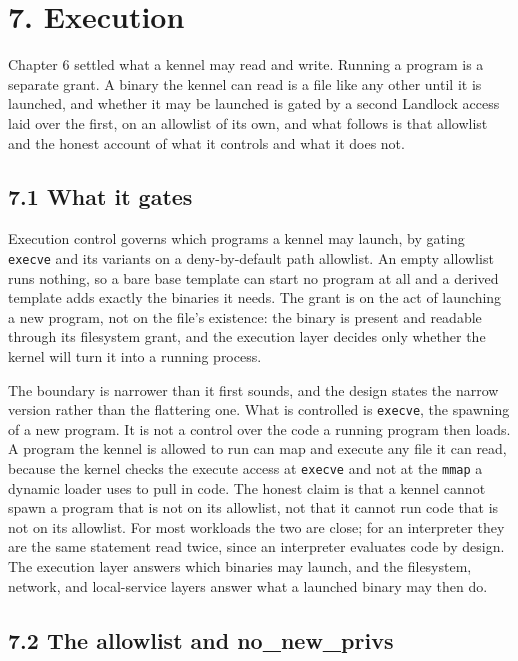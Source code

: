 \hypertarget{execution}{%
\chapter{7. Execution}\label{execution}}

Chapter 6 settled what a kennel may read and write. Running a program is
a separate grant. A binary the kennel can read is a file like any other
until it is launched, and whether it may be launched is gated by a
second Landlock access laid over the first, on an allowlist of its own,
and what follows is that allowlist and the honest account of what it
controls and what it does not.

\hypertarget{what-it-gates}{%
\section{7.1 What it gates}\label{what-it-gates}}

Execution control governs which programs a kennel may launch, by gating
\texttt{execve} and its variants on a deny-by-default path allowlist. An
empty allowlist runs nothing, so a bare base template can start no
program at all and a derived template adds exactly the binaries it
needs. The grant is on the act of launching a new program, not on the
file's existence: the binary is present and readable through its
filesystem grant, and the execution layer decides only whether the
kernel will turn it into a running process.

The boundary is narrower than it first sounds, and the design states the
narrow version rather than the flattering one. What is controlled is
\texttt{execve}, the spawning of a new program. It is not a control over
the code a running program then loads. A program the kennel is allowed
to run can map and execute any file it can read, because the kernel
checks the execute access at \texttt{execve} and not at the
\texttt{mmap} a dynamic loader uses to pull in code. The honest claim is
that a kennel cannot spawn a program that is not on its allowlist, not
that it cannot run code that is not on its allowlist. For most workloads
the two are close; for an interpreter they are the same statement read
twice, since an interpreter evaluates code by design. The execution
layer answers which binaries may launch, and the filesystem, network,
and local-service layers answer what a launched binary may then do.

\hypertarget{the-allowlist-and-no_new_privs}{%
\section{7.2 The allowlist and
no\_new\_privs}\label{the-allowlist-and-no_new_privs}}

